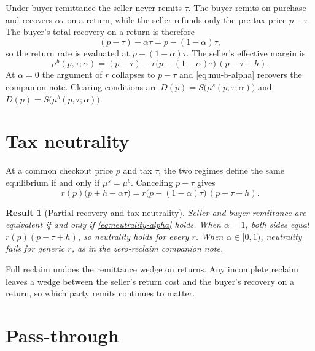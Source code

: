 \documentclass[11pt]{article}
\newtheorem{result}{Result}
\begin{document}
Under buyer remittance the seller never remits $\tau$.  The buyer remits on
purchase and recovers $\alpha\tau$ on a return, while the seller refunds only
the pre-tax price $p-\tau$.  The buyer's total recovery on a return is
therefore
\[
  (p-\tau)+\alpha\tau = p-(1-\alpha)\tau,
\]
so the return rate is evaluated at $p-(1-\alpha)\tau$.  The seller's
effective margin is
\begin{equation}
  \mu^{b}(p,\tau;\alpha)
  = (p-\tau)
    -r\bigl(p-(1-\alpha)\tau\bigr)\,(p-\tau+h).
  \label{eq:mu-b-alpha}
\end{equation}
At $\alpha=0$ the argument of $r$ collapses to $p-\tau$ and
\eqref{eq:mu-b-alpha} recovers the companion note.  Clearing conditions are
$D(p)=S\bigl(\mu^{s}(p,\tau;\alpha)\bigr)$ and
$D(p)=S\bigl(\mu^{b}(p,\tau;\alpha)\bigr)$.

\section{Tax neutrality}

At a common checkout price $p$ and tax $\tau$, the two regimes define the
same equilibrium if and only if $\mu^{s}=\mu^{b}$.  Canceling $p-\tau$ gives
\begin{equation}
  r(p)\bigl(p+h-\alpha\tau\bigr)
  =
  r\bigl(p-(1-\alpha)\tau\bigr)\,(p-\tau+h).
  \label{eq:neutrality-alpha}
\end{equation}
\begin{result}[Partial recovery and tax neutrality]
  Seller and buyer remittance are equivalent if and only if
  \eqref{eq:neutrality-alpha} holds.  When $\alpha=1$, both sides equal
  $r(p)(p-\tau+h)$, so neutrality holds for every $r$.  When $\alpha\in[0,1)$,
  neutrality fails for generic $r$, as in the zero-reclaim companion note.
\end{result}
Full reclaim undoes the remittance wedge on returns.  Any incomplete reclaim
leaves a wedge between the seller's return cost and the buyer's recovery on a
return, so which party remits continues to matter.

\section{Pass-through}
\end{document}
